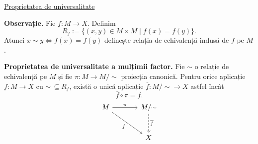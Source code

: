 \medskip
\noindent\underline{Proprietatea de universalitate}

\noindent\textbf{Observație.} Fie $f:M\to X$. Definim
\[
 R_f:=\{(x,y)\in M\times M\mid f(x)=f(y)\}.
\]
Atunci $x\sim y\iff f(x)=f(y)$ definește relația de echivalență
indusă de $f$ pe $M$.

\noindent{}\quad \textbf{Proprietatea de universalitate a mulțimii factor.}
Fie $\sim$ o relație de echivalență pe $M$ și fie
$\pi:M\to M/{\sim}$ proiecția canonică.
Pentru orice aplicație $f:M\to X$ cu $\sim\,\subseteq R_f$,
există o unică aplicație $\overline f:M/{\sim}\to X$ astfel încât
\[
 \overline f\circ\pi=f.
\]
\[
\begin{tikzcd}[column sep=large,row sep=large]
 M\arrow[r,"\pi"]\arrow[dr,"f"']
   & M/{\sim}\arrow[d,dashed,"{\overline f}"]\\
 & X
\end{tikzcd}
\]

\endgroup
